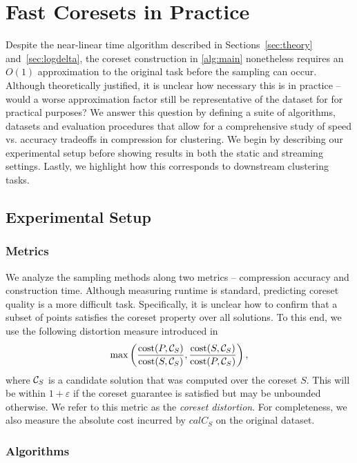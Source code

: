 \section{Fast Coresets in Practice}

Despite the near-linear time algorithm described in Sections~\ref{sec:theory} and~\ref{sec:logdelta}, the coreset construction in \ref{alg:main} nonetheless
requires an $O(1)$ approximation to the original task before the sampling can occur. Although theoretically justified, it is unclear how necessary this is in
practice -- would a worse approximation factor still be representative of the dataset for for practical purposes? We answer this question by defining a suite of
algorithms, datasets and evaluation procedures that allow for a comprehensive study of speed vs. accuracy tradeoffs in compression for clustering.  We begin by
describing our experimental setup before showing results in both the static and streaming settings.  Lastly, we highlight how this corresponds to downstream
clustering tasks.

\subsection{Experimental Setup}
\subsubsection{Metrics}
\label{sssec:metrics}

We analyze the sampling methods along two metrics -- compression accuracy and construction time. Although measuring runtime is standard, predicting coreset
quality is a more difficult task. Specifically, it is unclear how to confirm that a subset of points satisfies the coreset property over all solutions. To this
end, we use the following distortion measure introduced in~\cite{chrisESA} \[ \max \left( \dfrac{\operatorname{cost}(P, \mathcal C_{S})}{\operatorname{cost}(S, \mathcal C_{S})}, \dfrac{\operatorname{cost}(S,
\mathcal C_{S})}{\operatorname{cost}(P, \mathcal C_{S})} \right),\] where $\mathcal C_{S}$ is a candidate solution that was computed over the coreset $S$. This
will be within $1+\varepsilon$ if the coreset guarantee is satisfied but may be unbounded otherwise.  We refer to this metric as the \emph{coreset distortion}.
For completeness, we also measure the absolute cost incurred by $calC_S$ on the original dataset.

\subsubsection{Algorithms}
\label{ssec:algorithms}

